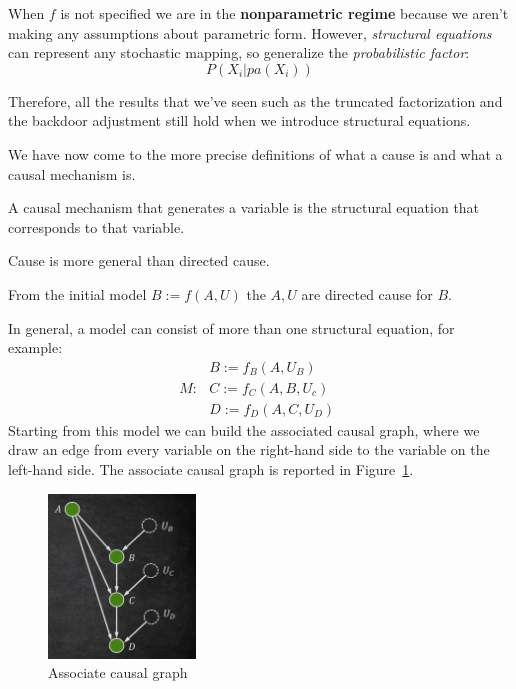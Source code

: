When $f$ is not specified we are in the \textbf{nonparametric regime} because we
aren't making any assumptions about parametric form. However, \textit{structural
    equations} can represent any stochastic mapping, so generalize the
\textit{probabilistic factor}:
\begin{equation*}
    P(X_i | pa(X_i))
\end{equation*}

Therefore, all the results that we've seen such as the truncated factorization
and the backdoor adjustment still hold when we introduce structural equations.

We have now come to the more precise definitions of what a cause is and what a
causal mechanism is.

\begin{definition}
    A causal mechanism that generates a variable is the structural equation
    that corresponds to that variable.
\end{definition}
\begin{note}
    Cause is more general than directed cause.
\end{note}
From the initial model $B := f(A,U)$ the $A, U$ are directed cause for $B$.

In general, a model can consist of more than one structural equation, for example:
\begin{equation}
    M : \,\, \begin{array}{l}
        B := f_B(A, U_B) \\ C := f_C(A, B, U_c) \\ D := f_D(A, C, U_D)
    \end{array}
\end{equation}
Starting from this model we can build the associated causal graph, where we draw
an edge from every variable on the right-hand side to the variable on the left-hand side.
The associate causal graph is reported in Figure~\ref{fig:associate_graph}.
\begin{figure}[!ht]
    \centering
    \includegraphics[width=0.35\textwidth]{img/structural_causal_model/graph_associate_structural_equation.png}
    \caption{Associate causal graph}
    \label{fig:associate_graph}
\end{figure}

